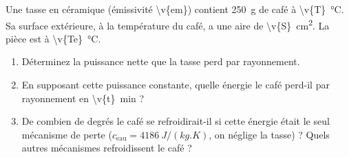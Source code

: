 Une tasse en céramique (émissivité \num{\v{em}}) contient \qty{250}{g} de café à \qty{\v{T}}{\degreeCelsius}. Sa surface extérieure, à la température du café, a une aire de \qty{\v{S}}{cm^2}. La pièce est à \qty{\v{Te}}{\degreeCelsius}.

\begin{enumerate}[label=\alph*)]
    \item Déterminez la puissance nette que la tasse perd par rayonnement.
    \item En supposant cette puissance constante, quelle énergie le café perd-il par rayonnement en \qty{\v{t}}{min} ?
    \item De combien de degrés le café se refroidirait-il si cette énergie était le seul mécanisme de perte ($c_{\text{eau}} = \qty{4186}{J/(kg.K)}$, on néglige la tasse) ? Quels autres mécanismes refroidissent le café ?
\end{enumerate}
